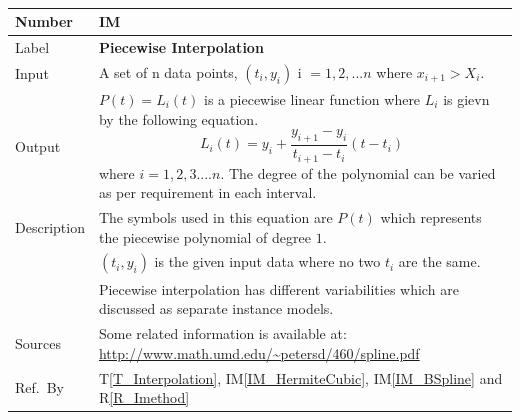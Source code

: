\documentclass[12pt]{article}
\newcommand{\colAwidth}{0.13\textwidth}
\newcommand{\colBwidth}{0.82\textwidth}
\newcommand{\tref}[1]{T\ref{#1}}
\newcounter{instnum} %
\newcommand{\iref}[1]{IM\ref{#1}}
\newcommand{\rref}[1]{R\ref{#1}}
\begin{document}
~\newline
\noindent
\begin{minipage}{\textwidth}
	\renewcommand*{\arraystretch}{1.5}
	\begin{tabular}{| p{\colAwidth} | p{\colBwidth}|}
		\hline
		\rowcolor[gray]{0.9}
		Number
		& IM{instnum}\theinstnum \label{IM_Piecewise}\\
		\hline
		
		Label
		& \bf Piecewise Interpolation\\
		\hline
		
		Input
		& A set of n data points, $(t_i,y_i)$ i $= {1,2,...n}$ where $x_{i+1} > X_i$.\\		
		\hline
		
		Output& $P(t) = L_i (t)$ is a piecewise linear function where $L_i$ is gievn by the following equation. 
		\begin{equation*}
		L_i (t) = y_i + \frac{y_{i+1} - y_i}{t_{i+1} - t_i} (t - t_i)
		\end{equation*}
		where $i = 1,2,3 ....n$. The degree of the polynomial can be varied as per requirement in each interval.\\
		\hline
		
		Description 
		& The symbols used in this equation are $P(t)$ which represents the piecewise polynomial of degree $1$.\\
		& $(t_i,y_i)$ is the given input data where no two $t_i$ are the same.\\
		&Piecewise interpolation has different variabilities which are discussed as separate instance models.\\
		\hline
		
		Sources& Some related information is available at:
		 \url{http://www.math.umd.edu/~petersd/460/spline.pdf}\\
		\hline
		Ref.\ By & \tref{T_Interpolation}, \iref{IM_HermiteCubic}, \iref{IM_BSpline} and
		\rref{R_Imethod}\\
		\hline
	\end{tabular}
\end{minipage}\\





\end{document}
